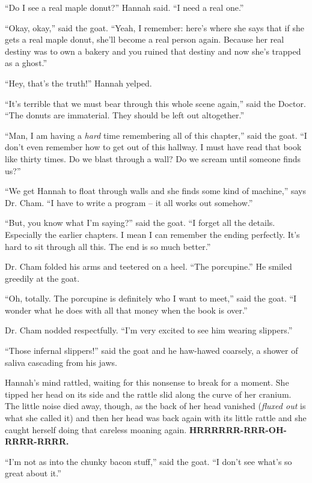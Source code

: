 \documentclass[12pt,twoside]{report}
\begin{document}
``Do I see a real maple donut?'' Hannah said.  ``I need a real one.''

``Okay, okay,'' said the goat.  ``Yeah, I remember: here's where she
says that if she gets a real maple donut, she'll become a real person
again. Because her real destiny was to own a bakery and you ruined
that destiny and now she's trapped as a ghost.''

``Hey, that's the truth!'' Hannah yelped.

``It's terrible that we must bear through this whole scene again,''
said the Doctor.  ``The donuts are immaterial.  They should be left
out altogether.''

``Man, I am having a {\em hard} time remembering all of this
chapter,'' said the goat.  ``I don't even remember how to get out of
this hallway.  I must have read that book like thirty times.  Do we
blast through a wall?  Do we scream until someone finds us?''

``We get Hannah to float through walls and she finds some kind of
machine,'' says Dr. Cham.  ``I have to write a program -- it all works
out somehow.''

``But, you know what I'm saying?'' said the goat.  ``I forget all the
details. Especially the earlier chapters.  I mean I can remember the
ending perfectly. It's hard to sit through all this.  The end is so
much better.''

Dr. Cham folded his arms and teetered on a heel.  ``The porcupine.''
He smiled greedily at the goat.

``Oh, totally.  The porcupine is definitely who I want to meet,'' said
the goat.  ``I wonder what he does with all that money when the book
is over.''

Dr. Cham nodded respectfully.  ``I'm very excited to see him wearing
slippers.''

``Those infernal slippers!'' said the goat and he haw-hawed coarsely,
a shower of saliva cascading from his jaws.

Hannah's mind rattled, waiting for this nonsense to break for a
moment. She tipped her head on its side and the rattle slid along the
curve of her cranium.  The little noise died away, though, as the back
of her head vanished ({\em fluxed out} is what she called it) and then
her head was back again with its little rattle and she caught herself
doing that careless moaning again.  {\bf HRRRRRR-RRR-OH-RRRR-RRRR.}

``I'm not as into the chunky bacon stuff,'' said the goat.  ``I don't
see what's so great about it.''
\end{document}
